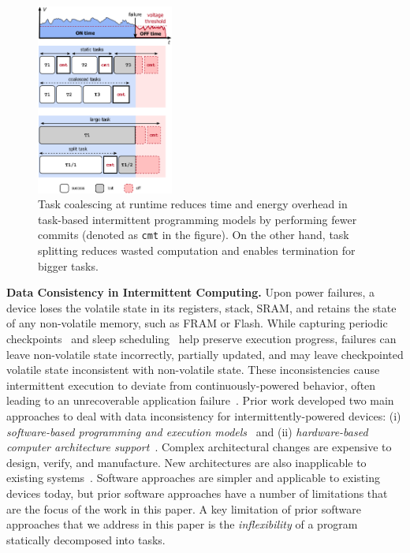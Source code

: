 \begin{figure}
    \centering
    \includegraphics[width=0.4\textwidth]{figures/intro-figure.pdf}
    \caption{Task coalescing at runtime reduces time and energy overhead in task-based intermittent programming models by performing fewer commits (denoted as \texttt{cmt} in the figure). On the other hand, task splitting reduces wasted computation and enables termination for bigger tasks.}
    \label{fig:coalesce}
\end{figure}

\textbf{Data Consistency in Intermittent Computing.}  
Upon power failures, a device loses the volatile
state in its registers, stack, SRAM, and retains the state of any non-volatile
memory, such as FRAM or Flash. While capturing periodic
checkpoints~\citep{mementos,quickrecall} and sleep
scheduling~\citep{dewdrop,hibernus,hibernusplusplus} help preserve execution
progress, failures can leave non-volatile state incorrectly, partially updated,
and may leave checkpointed volatile state inconsistent with non-volatile state.
These inconsistencies cause intermittent execution to deviate from
continuously-powered behavior, often leading to an unrecoverable
application failure~\citep{dino,edb}. Prior work developed two main approaches to deal with data inconsistency for
intermittently-powered devices: (i) \emph{software-based programming and
execution models}~\citep{dino,ratchet,chain,alpaca} and (ii)
\emph{hardware-based computer architecture
support}~\citep{hicks_isca_2017,idetic,nvp}. Complex architectural changes are
expensive to design, verify, and manufacture. New architectures are also
inapplicable to existing systems~\citep{hicks_isca_2017,nvp}. Software
approaches are simpler and applicable to existing devices today, but prior
software approaches have a number of limitations that are the focus of the work
in this paper. A key limitation of prior software approaches that we address in this paper is the {\em inflexibility} of a program statically decomposed into tasks. 

